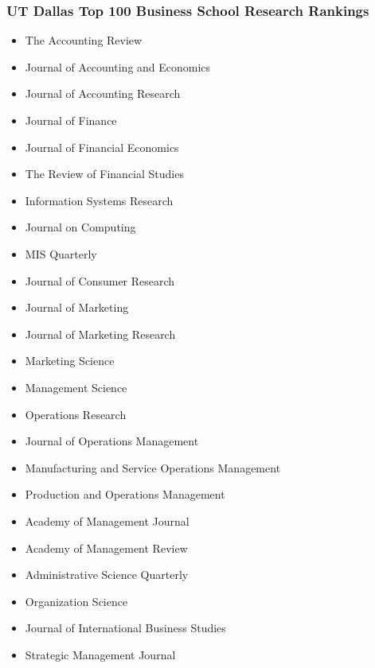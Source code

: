 \subsubsection*{UT Dallas Top 100 Business School Research Rankings}
\begin{itemize}
    \item The Accounting Review
    \item Journal of Accounting and Economics
    \item Journal of Accounting Research
    \item Journal of Finance
    \item Journal of Financial Economics
    \item The Review of Financial Studies
    \item Information Systems Research
    \item Journal on Computing
    \item MIS Quarterly
    \item Journal of Consumer Research
    \item Journal of Marketing
    \item Journal of Marketing Research
    \item Marketing Science
    \item Management Science
    \item Operations Research
    \item Journal of Operations Management
    \item Manufacturing and Service Operations Management
    \item Production and Operations Management
    \item Academy of Management Journal
    \item Academy of Management Review
    \item Administrative Science Quarterly
    \item Organization Science
    \item Journal of International Business Studies
    \item Strategic Management Journal
\end{itemize}